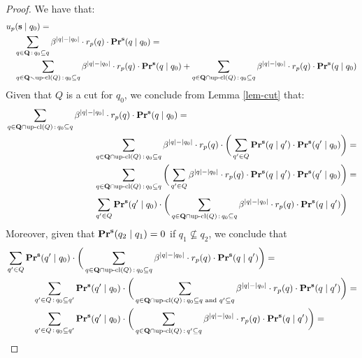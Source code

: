 \begin{proof} We have that: 
\begin{align*}
&u_p(\mathbf{s} \mid q_0) =\\
&\hspace{10pt} \sum_{q \in \mathbf{Q} \,:\, q_0 \subseteq q} \beta^{|q|-|q_0|} \cdot r_p(q) \cdot \mathbf{Pr}^{\mathbf{s}}(q \mid q_0) =\\
&\hspace{10pt} \sum_{q \in \mathbf{Q} \smallsetminus \text{\rm up-cl}(Q)\,:\, q_0 \subseteq q} \beta^{|q|-|q_0|} \cdot r_p(q) \cdot \mathbf{Pr}^{\mathbf{s}}(q \mid q_0) + 
\sum_{q \in \mathbf{Q} \cap \text{\rm up-cl}(Q)\,:\, q_0 \subseteq q} \beta^{|q|-|q_0|} \cdot r_p(q) \cdot \mathbf{Pr}^{\mathbf{s}}(q \mid q_0)
\end{align*}
Given that $Q$ is a cut for $q_0$, we conclude from Lemma \ref{lem-cut} that:
\begin{align*}
&\sum_{q \in \bQ \cap \ucl(Q)\,:\, q_0 \subseteq q} \beta^{|q|-|q_0|} \cdot r_p(q) \cdot \pr^{\bs}(q \mid q_0) =\\
&\hspace{100pt} \sum_{q \in \bQ \cap \ucl(Q)\,:\, q_0 \subseteq q} \beta^{|q|-|q_0|} \cdot r_p(q) \cdot \bigg(\sum_{q' \in Q} \pr^{\bs}(q \mid q') \cdot \pr^{\bs}(q' \mid q_0)\bigg) =\\
&\hspace{100pt} \sum_{q \in \bQ \cap \ucl(Q)\,:\, q_0 \subseteq q} \bigg(\sum_{q' \in Q} \beta^{|q|-|q_0|} \cdot r_p(q) \cdot  \pr^{\bs}(q \mid q') \cdot \pr^{\bs}(q' \mid q_0)\bigg) =\\
&\hspace{100pt}  \sum_{q' \in Q} \pr^{\bs}(q' \mid q_0) \cdot \bigg(\sum_{q \in \bQ \cap \ucl(Q)\,:\, q_0 \subseteq q} \beta^{|q|-|q_0|} \cdot r_p(q) \cdot  \pr^{\bs}(q \mid q')\bigg) 
\end{align*}
Moreover, given that $\mathbf{Pr}^{\mathbf{s}}(q_2 \mid q_1) = 0$ if $q_1 \not\subseteq q_2$, we conclude that
\begin{align*}
& \sum_{q' \in Q} \pr^{\bs}(q' \mid q_0) \cdot \bigg(\sum_{q \in \bQ \cap \ucl(Q)\,:\, q_0 \subseteq q} \beta^{|q|-|q_0|} \cdot r_p(q) \cdot  \pr^{\bs}(q \mid q')\bigg) =\\
& \hspace{30pt}\sum_{q' \in Q \,:\, q_0 \subseteq q'} \pr^{\bs}(q' \mid q_0) \cdot \bigg(\sum_{q \in \bQ \cap \ucl(Q)\,:\, q_0 \subseteq q \text{ and } q' \subseteq q} \beta^{|q|-|q_0|} \cdot r_p(q) \cdot  \pr^{\bs}(q \mid q')\bigg)  =\\
&\hspace{30pt} \sum_{q' \in Q \,:\, q_0 \subseteq q'} \pr^{\bs}(q' \mid q_0) \cdot \bigg(\sum_{q \in \bQ \cap \ucl(Q)\,:\, q' \subseteq q} \beta^{|q|-|q_0|} \cdot r_p(q) \cdot  \pr^{\bs}(q \mid q')\bigg)  =\\

\end{align*}
\end{proof}
